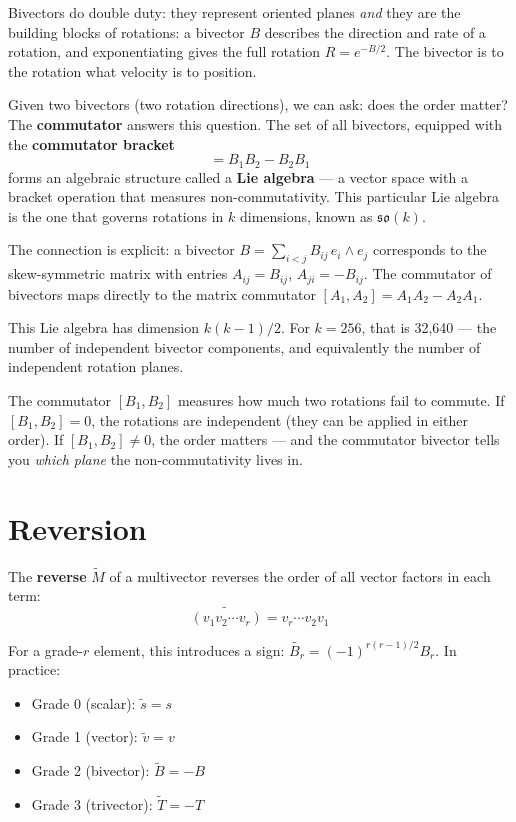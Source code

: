 \documentclass[11pt, twoside, openright]{memoir}
\newcommand{\op}{\wedge}          %
\newcommand{\rev}[1]{\widetilde{#1}} %
\numberwithin{equation}{chapter}
\begin{document}
Bivectors do double duty: they represent oriented planes \emph{and}
they are the building blocks of rotations: a bivector $B$ describes the direction and rate of a rotation, and exponentiating gives the full rotation $R = e^{-B/2}$. The bivector is to the rotation what velocity is to position.

Given two bivectors (two rotation directions), we can ask: does the order matter? The \textbf{commutator} answers this question. The set of all
bivectors, equipped with the \textbf{commutator bracket}
\begin{equation}
  [B_1, B_2] = B_1 B_2 - B_2 B_1
\end{equation}
forms an algebraic structure called a \textbf{Lie algebra} --- a vector space with a bracket operation that measures non-commutativity. This particular Lie algebra is the one that governs rotations in $k$ dimensions, known as $\mathfrak{so}(k)$.

The connection is explicit: a bivector
$B = \sum_{i < j} B_{ij} \, e_i \op e_j$
corresponds to the skew-symmetric matrix with entries $A_{ij} = B_{ij}$,
$A_{ji} = -B_{ij}$.  The commutator of bivectors maps directly to the
matrix commutator $[A_1, A_2] = A_1 A_2 - A_2 A_1$.

This Lie algebra has dimension $k(k-1)/2$.  For $k = 256$, that is
32,640 --- the number of independent bivector components, and
equivalently the number of independent rotation planes.

The commutator $[B_1, B_2]$ measures how much two rotations fail to
commute.  If $[B_1, B_2] = 0$, the rotations are independent (they can
be applied in either order).  If $[B_1, B_2] \neq 0$, the order matters
--- and the commutator bivector tells you \emph{which plane} the
non-commutativity lives in.

\section{Reversion}

The \textbf{reverse} $\rev{M}$ of a multivector reverses the order of
all vector factors in each term:
\begin{equation}
  \rev{(v_1 v_2 \cdots v_r)} = v_r \cdots v_2 v_1
\end{equation}

For a grade-$r$ element, this introduces a sign: $\rev{B_r} = (-1)^{r(r-1)/2} B_r$.
In practice:
\begin{itemize}[nosep]
\item Grade 0 (scalar): $\rev{s} = s$
\item Grade 1 (vector): $\rev{v} = v$
\item Grade 2 (bivector): $\rev{B} = -B$
\item Grade 3 (trivector): $\rev{T} = -T$
\end{itemize}
\end{document}

